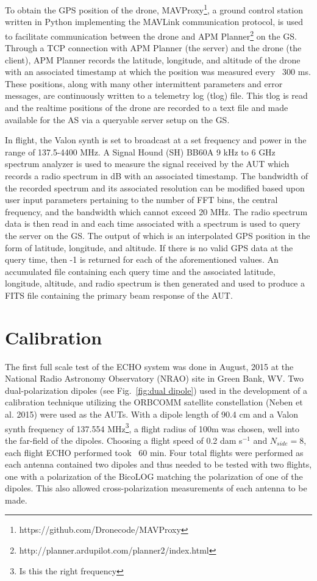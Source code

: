 \documentclass[preprint2]{aastex}
\begin{document}
\cite{2005ApJ...622..759G}

To obtain the GPS position of the drone, MAVProxy\footnote{https://github.com/Dronecode/MAVProxy}, a ground control station written in Python implementing the MAVLink communication protocol, is used to facilitate communication between the drone and APM Planner\footnote{http://planner.ardupilot.com/planner2/index.html} on the GS. Through a TCP connection with APM Planner (the server) and the drone (the client), APM Planner records the latitude, longitude, and altitude of the drone with an associated timestamp at which the position was measured every ~300 ms.  These positions, along with many other intermittent parameters and error messages, are continuously written to a telemetry log (tlog) file.  This tlog is read and the realtime positions of the drone are recorded to a text file and made available for the AS via a queryable server setup on the GS.

In flight, the Valon synth is set to broadcast at a set frequency and power in the range of 137.5-4400 MHz.  A Signal Hound (SH) BB60A 9 kHz to 6 GHz spectrum analyzer is used to measure the signal received by the AUT which records a radio spectrum in dB with an associated timestamp.  The bandwidth of the recorded spectrum and its associated resolution can be modified based upon user input parameters pertaining to the number of FFT bins, the central frequency, and the bandwidth which cannot exceed 20 MHz.  The radio spectrum data is then read in and each time associated with a spectrum is used to query the server on the GS.  The output of which is an interpolated GPS position in the form of latitude, longitude, and altitude.  If there is no valid GPS data at the query time, then -1 is returned for each of the aforementioned values.  An accumulated file containing each query time and the associated latitude, longitude, altitude, and radio spectrum is then generated and used to produce a FITS file containing the primary beam response of the AUT.


\section{Calibration}

The first full scale test of the ECHO system was done in August, 2015 at the National Radio Astronomy Observatory (NRAO) site in Green Bank, WV.  Two dual-polarization dipoles (see Fig.~\ref{fig:dual dipole}) used in the development of a calibration technique utilizing the ORBCOMM satellite constellation (Neben et al. 2015) were used as the AUTs.  With a dipole length of 90.4 cm and a Valon synth frequency of 137.554 MHz\footnote{Is this the right frequency}, a flight radius of 100m was chosen, well into the far-field of the dipoles.  Choosing a flight speed of 0.2 dam s$^{-1}$ and $N_{side}=8$, each flight ECHO performed took ~60 min.  Four total flights were performed as each antenna contained two dipoles and thus needed to be tested with two flights, one with a polarization of the BicoLOG matching the polarization of one of the dipoles.  This also allowed cross-polarization measurements of each antenna to be made.
\end{document}
